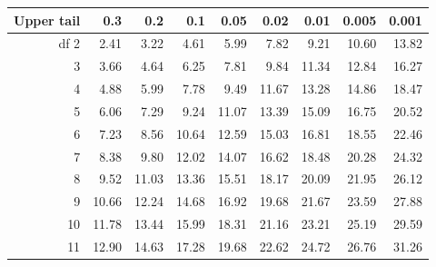 \begin{center}
\begin{tabular}{r | rrrr | rrrr |}
  \hline
Upper tail & 0.3 & 0.2 & 0.1 & 0.05 & 0.02 & 0.01 & 0.005 & 0.001 \\ 
  \hline
df \hfill 2 & \footnotesize 2.41 & \footnotesize 3.22 & \footnotesize 4.61 & \footnotesize 5.99 & \footnotesize 7.82 & \footnotesize 9.21 & \footnotesize 10.60 & \footnotesize 13.82 \\ 
  3 & \footnotesize 3.66 & \footnotesize 4.64 & \footnotesize 6.25 & \footnotesize 7.81 & \footnotesize 9.84 & \footnotesize 11.34 & \footnotesize 12.84 & \footnotesize 16.27 \\ 
  4 & \footnotesize 4.88 & \footnotesize 5.99 & \footnotesize 7.78 & \footnotesize 9.49 & \footnotesize 11.67 & \footnotesize 13.28 & \footnotesize 14.86 & \footnotesize 18.47 \\ 
  5 & \footnotesize 6.06 & \footnotesize 7.29 & \footnotesize 9.24 & \footnotesize 11.07 & \footnotesize 13.39 & \footnotesize 15.09 & \footnotesize 16.75 & \footnotesize 20.52 \\ 
  \hline
  6 & \footnotesize 7.23 & \footnotesize 8.56 & \footnotesize 10.64 & \footnotesize 12.59 & \footnotesize 15.03 & \footnotesize 16.81 & \footnotesize 18.55 & \footnotesize 22.46 \\ 
  7 & \footnotesize 8.38 & \footnotesize 9.80 & \footnotesize 12.02 & \footnotesize 14.07 & \footnotesize 16.62 & \footnotesize 18.48 & \footnotesize 20.28 & \footnotesize 24.32 \\ 
  8 & \footnotesize 9.52 & \footnotesize 11.03 & \footnotesize 13.36 & \footnotesize 15.51 & \footnotesize 18.17 & \footnotesize 20.09 & \footnotesize 21.95 & \footnotesize 26.12 \\ 
  9 & \footnotesize 10.66 & \footnotesize 12.24 & \footnotesize 14.68 & \footnotesize 16.92 & \footnotesize 19.68 & \footnotesize 21.67 & \footnotesize 23.59 & \footnotesize 27.88 \\ 
  10 & \footnotesize 11.78 & \footnotesize 13.44 & \footnotesize 15.99 & \footnotesize 18.31 & \footnotesize 21.16 & \footnotesize 23.21 & \footnotesize 25.19 & \footnotesize 29.59 \\ 
  \hline
  11 & \footnotesize \footnotesize 12.90 & \footnotesize 14.63 & \footnotesize 17.28 & \footnotesize 19.68 & \footnotesize 22.62 & \footnotesize 24.72 & \footnotesize 26.76 & \footnotesize 31.26 \\ 

\end{tabular}
\end{center}
